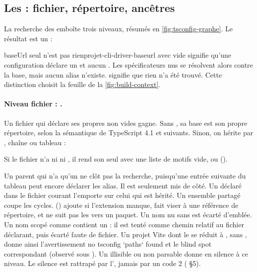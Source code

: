 \subsection{Les  : fichier, répertoire, ancêtres}
\label{sec:projet-cli-driver-tsconfig}

La recherche des  emboîte trois niveaux, résumés en \cref{fig:tsconfig-graphe}. Le résultat est un  :


\begin{invariant}{\og baseUrl seul\fg{} n'est pas \og rien\fg{}}{projet-cli-driver-baseurl}
 avec  vide signifie qu'une configuration déclare un  et aucun . Les spécificateurs nus se résolvent alors contre la base, mais aucun alias n'existe.  signifie que rien n'a été trouvé. Cette distinction choisit la feuille de la \cref{fig:build-context}.
\end{invariant}

\paragraph{Niveau fichier : .} Un fichier qui déclare ses propres  non vides gagne. Sans , sa base est son propre répertoire, selon la sémantique de TypeScript 4.1 et suivants. Sinon, on hérite par , chaîne ou tableau :


Si le fichier n'a ni  ni , il rend son  seul avec une liste de motifs vide, ou  ().

Un parent qui n'a qu'un  ne clôt pas la recherche, puisqu'une entrée suivante du tableau peut encore déclarer les alias. Il est seulement mis de côté. Un  déclaré dans le fichier courant l'emporte sur celui qui est hérité. Un ensemble  partagé coupe les cycles.  () ajoute  si l'extension manque, fait viser  à une référence de répertoire, et ne suit pas les  vers un paquet. Un nom nu sans \code{/} est écarté d'emblée. Un nom scopé comme  contient un \code{/} : il est tenté comme chemin relatif au fichier déclarant, puis écarté faute de fichier. Un projet Vite dont le  se réduit à , sans , donne ainsi l'avertissement \og no tsconfig `paths` found\fg{} et le blind spot correspondant (observé sous ).
Un  illisible ou non parsable donne  en silence à ce niveau. Le silence est rattrapé par l', jamais par un code 2 ( §5).

